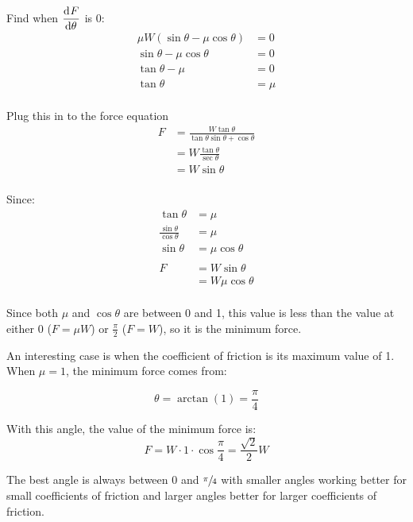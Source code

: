 \documentclass[letterpaper, landscape]{exam}
\begin{document}
\begin{description}
      Find when $\dod{F}{\theta}$ is 0:
      \begin{align*}
        \mu  W (\sin \theta - \mu \cos \theta) & = 0 \\
        \sin \theta - \mu \cos \theta          & = 0 \\
        \tan \theta - \mu                      & = 0 \\
        \tan \theta                            & = \mu \\
      \end{align*}

      Plug this in to the force equation
      \begin{align*}
        F & = \frac{W \tan \theta}{\tan \theta \sin \theta + \cos \theta} \\
          & = W \frac{\tan \theta}{\sec \theta} \\
          & = W \sin \theta \\
      \end{align*}

      Since:
      \begin{align*}
        \tan \theta                     & = \mu \\
        \frac{\sin \theta}{\cos \theta} & = \mu \\
        \sin \theta                     & = \mu \cos \theta \\
        \\
        F & = W \sin \theta \\
          & = W \mu \cos \theta \\
      \end{align*}

      Since both $\mu$ and $\cos \theta$ are between 0 and 1, this value is less than the value at
      either $0$ ($F = \mu W$) or $\frac{\pi}{2}$ ($F = W$), so it is the minimum force.

      An interesting case is when the coefficient of friction is its maximum value of 1. When 
      $\mu = 1$, the minimum force comes from:

      \[
        \theta = \arctan(1) = \frac{\pi}{4}
      \]
      
      With this angle, the value of the minimum force is:
      \[
        F = W \cdot 1 \cdot \cos \frac{\pi}{4} = \frac{\sqrt{2}}{2} W
      \]

      The best angle is always between $0$ and $\sfrac{\pi}{4}$ with smaller angles working better
      for small coefficients of friction and larger angles better for larger coefficients of
      friction.

  \end{description}
\end{document}
